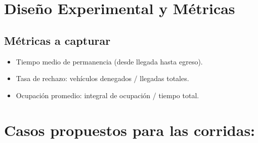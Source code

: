 \documentclass[12pt]{article}
\begin{document}
\section{Diseño Experimental y Métricas}

\subsection{Métricas a capturar}
\begin{itemize}
    \item Tiempo medio de permanencia (desde llegada hasta egreso).
    \item Tasa de rechazo: vehículos denegados / llegadas totales.
    \item Ocupación promedio: integral de ocupación / tiempo total.
\end{itemize}

\section{Casos propuestos para las corridas: }
\label{tab:experimentos}
\end{document}
